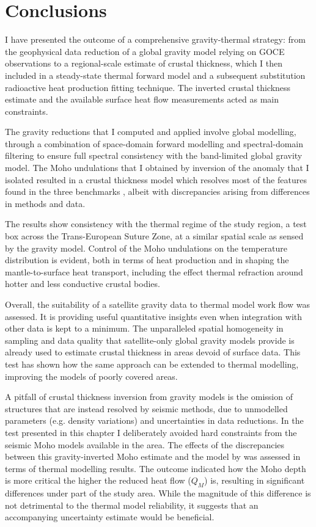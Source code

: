 \section{Conclusions}
\label{s:Appl:Concl}

I have presented the outcome of a comprehensive gravity-thermal strategy: from the geophysical data reduction of a global gravity model relying on GOCE observations to a regional-scale estimate of crustal thickness, which I then included in a steady-state thermal forward model and a subsequent substitution radioactive heat production fitting technique.
The inverted crustal thickness estimate and the available surface heat flow measurements acted as main constraints.

The gravity reductions that I computed and applied involve global modelling, through a combination of space-domain forward modelling and spectral-domain filtering to ensure full spectral consistency with the band-limited global gravity model.
The Moho undulations that I obtained by inversion of the anomaly that I isolated resulted in a crustal thickness model which resolves most of the features found in the three benchmarks \parencites{Grad2009}{Reguzzoni2015}{Pasyanos2014}, albeit with discrepancies arising from differences in methods and data.

The results show consistency with the thermal regime of the study region, a test box across the Trans-European Suture Zone, at a similar spatial scale as sensed by the gravity model.
Control of the Moho undulations on the temperature distribution is evident, both in terms of heat production and in shaping the mantle-to-surface heat transport, including the effect thermal refraction around hotter and less conductive crustal bodies.

Overall, the suitability of a satellite gravity data to thermal model work flow was assessed.
It is providing useful quantitative insights even when integration with other data is kept to a minimum.
The unparalleled spatial homogeneity in sampling and data quality that satellite-only global gravity models provide is already used to estimate crustal thickness in areas devoid of surface data.
This test has shown how the same approach can be extended to thermal modelling, improving the models of poorly covered areas.

A pitfall of crustal thickness inversion from gravity models is the omission of structures that are instead resolved by seismic methods, due to unmodelled parameters (e.g. density variations) and uncertainties in data reductions.
In the test presented in this chapter I deliberately avoided hard constraints from the seismic Moho models available in the area.
The effects of the discrepancies between this gravity-inverted Moho estimate and the model by \textcite{Grad2009} was assessed in terms of thermal modelling results.
The outcome indicated how the Moho depth is more critical the higher the reduced heat flow ($Q_M$) is, resulting in significant differences under part of the study area.
While the magnitude of this difference is not detrimental to the thermal model reliability, it suggests that an accompanying uncertainty estimate would be beneficial.

